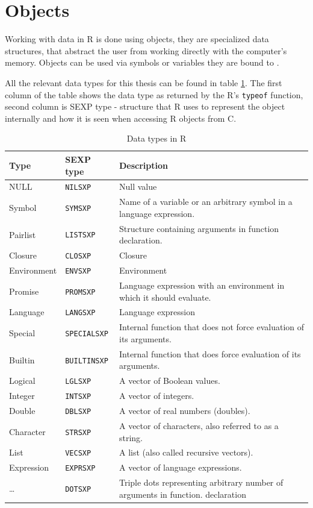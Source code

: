 \documentclass[thesis=B,english]{FITthesis}[2012/10/20]
\begin{document}
\section{Objects}
Working with data in R is done using objects, they are specialized data structures, that abstract the user from working directly with the computer's memory. Objects can be used via symbols or variables they are bound to \cite{specs}.

All the relevant data types for this thesis can be found in table \ref{tab:types}. The first column of the table shows the data type as returned by the R’s \verb|typeof| function, second column is SEXP type - structure that R uses to represent the object internally and how it is seen when accessing R objects from C.

\begin{table}
	\caption[Data types in R]{Data types in R}\label{tab:types}
	\begin{tabularx}{1\textwidth}{|l|l|X|}\hline
		Type		& SEXP type		& Description \tabularnewline \hline \hline
		NULL		& \verb|NILSXP|		& Null value  \tabularnewline \hline
		Symbol	& \verb|SYMSXP|	& Name of a variable or an arbitrary symbol in a language expression.  \tabularnewline \hline
		Pairlist	& \verb|LISTSXP|	& Structure containing arguments in function declaration. \tabularnewline \hline
		Closure	& \verb|CLOSXP|	& Closure  \tabularnewline \hline
		Environment	& \verb|ENVSXP|	& Environment  \tabularnewline \hline
		Promise	& \verb|PROMSXP|	& Language expression with an environment in which it should evaluate. \tabularnewline \hline
		Language	& \verb|LANGSXP|	& Language expression  \tabularnewline \hline
		Special	& \verb|SPECIALSXP|	& Internal function that does not force evaluation of its arguments. \tabularnewline \hline
		Builtin	& \verb|BUILTINSXP|	& Internal function that does force evaluation of its arguments. \tabularnewline \hline
		Logical	& \verb|LGLSXP|	& A vector of Boolean values. \tabularnewline \hline
		Integer	& \verb|INTSXP|	& A vector of integers.  \tabularnewline \hline
		Double	& \verb|DBLSXP|	& A vector of real numbers (doubles).  \tabularnewline \hline
		Character & \verb|STRSXP| & A vector of characters, also referred to as a string. \tabularnewline \hline
		List	& \verb|VECSXP|	& A list (also called recursive vectors).  \tabularnewline \hline
		Expression	& \verb|EXPRSXP|	& A vector of language expressions.  \tabularnewline \hline
		\ldots	& \verb|DOTSXP|	& Triple dots representing arbitrary number of arguments in function. declaration  \tabularnewline \hline		
	\end{tabularx}
\end{table}
\end{document}
